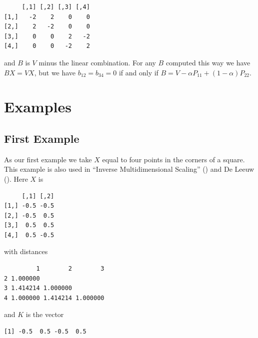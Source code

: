 \documentclass[
  12pt,
  letterpaper,
  DIV=11,
  numbers=noendperiod]{scrreprt}
\theoremstyle{remark}
\begin{document}
\begin{verbatim}
     [,1] [,2] [,3] [,4]
[1,]   -2    2    0    0
[2,]    2   -2    0    0
[3,]    0    0    2   -2
[4,]    0    0   -2    2
\end{verbatim}

and \(B\) is \(V\) minus the linear combination. For any \(B\) computed
this way we have \(BX=VX\), but we have \(b_{12}=b_{34}=0\) if and only
if \(B=V-\alpha P_{11} + (1-\alpha) P_{22}\).

\section{Examples}\label{examples-2}

\subsection{First Example}\label{first-example}

As our first example we take \(X\) equal to four points in the corners
of a square. This example is also used in {``{Inverse Multidimensional
Scaling}''} () and De Leeuw
(). Here \(X\) is

\begin{verbatim}
     [,1] [,2]
[1,] -0.5 -0.5
[2,] -0.5  0.5
[3,]  0.5  0.5
[4,]  0.5 -0.5
\end{verbatim}

with distances

\begin{verbatim}
         1        2        3
2 1.000000                  
3 1.414214 1.000000         
4 1.000000 1.414214 1.000000
\end{verbatim}

and \(K\) is the vector

\begin{verbatim}
[1] -0.5  0.5 -0.5  0.5
\end{verbatim}
\end{document}
